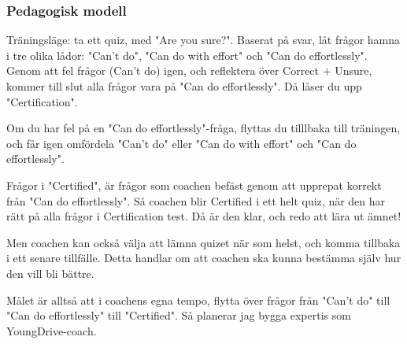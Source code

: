   \subsubsection{Pedagogisk modell}
  Träningsläge: ta ett quiz, med "Are you sure?". Baserat på svar, låt frågor hamna i tre olika lådor: "Can't do", "Can do with effort" och "Can do effortlessly". Genom att fel frågor (Can't do) igen, och reflektera över Correct + Unsure, kommer till slut alla frågor vara på "Can do effortlessly". Då låser du upp "Certification".

Om du har fel på en "Can do effortlessly"-fråga, flyttas du tilllbaka till träningen, och får igen omfördela "Can't do" eller "Can do with effort" och "Can do effortlessly".

Frågor i "Certified", är frågor som coachen befäst genom att upprepat korrekt från "Can do effortlessly". Så coachen blir Certified i ett helt quiz, när den har rätt på alla frågor i Certification test. Då är den klar, och redo att lära ut ämnet!

Men coachen kan också välja att lämna quizet när som helst, och komma tillbaka i ett senare tillfälle. Detta handlar om att coachen ska kunna bestämma själv hur den vill bli bättre.

Målet är alltså att i coachens egna tempo, flytta över frågor från "Can't do" till "Can do effortlessly" till "Certified". Så planerar jag bygga expertis som YoungDrive-coach.
